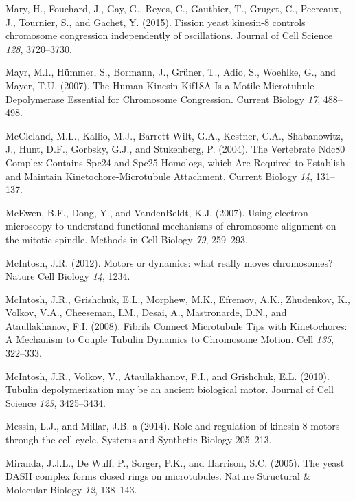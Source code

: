 \documentclass[12pt,a4paper,twoside,openright]{book}
\begin{document}
Mary, H., Fouchard, J., Gay, G., Reyes, C., Gauthier, T., Gruget, C.,
Pecreaux, J., Tournier, S., and Gachet, Y. (2015). Fission yeast
kinesin-8 controls chromosome congression independently of oscillations.
Journal of Cell Science \emph{128}, 3720--3730.

Mayr, M.I., Hümmer, S., Bormann, J., Grüner, T., Adio, S., Woehlke, G.,
and Mayer, T.U. (2007). The Human Kinesin Kif18A Is a Motile Microtubule
Depolymerase Essential for Chromosome Congression. Current Biology
\emph{17}, 488--498.

McCleland, M.L., Kallio, M.J., Barrett-Wilt, G.A., Kestner, C.A.,
Shabanowitz, J., Hunt, D.F., Gorbsky, G.J., and Stukenberg, P. (2004).
The Vertebrate Ndc80 Complex Contains Spc24 and Spc25 Homologs, which
Are Required to Establish and Maintain Kinetochore-Microtubule
Attachment. Current Biology \emph{14}, 131--137.

McEwen, B.F., Dong, Y., and VandenBeldt, K.J. (2007). Using electron
microscopy to understand functional mechanisms of chromosome alignment
on the mitotic spindle. Methods in Cell Biology \emph{79}, 259--293.

McIntosh, J.R. (2012). Motors or dynamics: what really moves
chromosomes? Nature Cell Biology \emph{14}, 1234.

McIntosh, J.R., Grishchuk, E.L., Morphew, M.K., Efremov, A.K.,
Zhudenkov, K., Volkov, V.A., Cheeseman, I.M., Desai, A., Mastronarde,
D.N., and Ataullakhanov, F.I. (2008). Fibrils Connect Microtubule Tips
with Kinetochores: A Mechanism to Couple Tubulin Dynamics to Chromosome
Motion. Cell \emph{135}, 322--333.

McIntosh, J.R., Volkov, V., Ataullakhanov, F.I., and Grishchuk, E.L.
(2010). Tubulin depolymerization may be an ancient biological motor.
Journal of Cell Science \emph{123}, 3425--3434.

Messin, L.J., and Millar, J.B. a (2014). Role and regulation of
kinesin-8 motors through the cell cycle. Systems and Synthetic Biology
205--213.

Miranda, J.J.L., De Wulf, P., Sorger, P.K., and Harrison, S.C. (2005).
The yeast DASH complex forms closed rings on microtubules. Nature
Structural \& Molecular Biology \emph{12}, 138--143.
\end{document}
